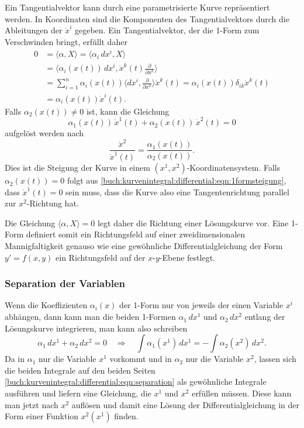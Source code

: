 Ein Tangentialvektor kann durch eine parametrisierte Kurve repräsentiert
werden.
In Koordinaten sind die Komponenten des Tangentialvektors durch
die Ableitungen der $\dot{x}^i$ gegeben.
Ein Tangentialvektor, der die 1-Form zum Verschwinden bringt, erfüllt
daher
\begin{align*}
0
&=
\langle\alpha, X\rangle
=
\langle
\alpha_i\,dx^i,
X
\rangle
\\
&=
\biggl\langle
\alpha_i(x(t))\,dx^i,
\dot{x}^k(t)\frac{\partial}{\partial x^k}
\biggr\rangle
\\
&=
\sum_{i=1}^n
\alpha_i(x(t))
\biggl\langle
dx^i,\frac{\partial}{\partial x^k}
\biggr\rangle
\dot{x}^k(t)
=
\alpha_i(x(t))\delta_{ik}\dot{x}^k(t)
\\
&=
\alpha_i(x(t))\dot{x}^i(t).
\end{align*}
Falls $\alpha_2(x(t))\ne 0$ ist, kann die Gleichung
\begin{equation}
\alpha_1(x(t))\, \dot{x}^1(t) + \alpha_2(x(t))\,\dot{x}^2(t) = 0
\label{buch:kurvenintegral:differential:eqn:1formsteigung}
\end{equation}
aufgelöst werden nach
\[
\frac{\dot{x}^2}{\dot{x}^1(t)}
=
\frac{\alpha_1(x(t))}{\alpha_2(x(t))}.
\]
Dies ist die Steigung der Kurve in einem 
$(x^1,x^2)$-Koordinatensystem.
Falls $\alpha_2(x(t))=0$ folgt aus
\eqref{buch:kurvenintegral:differential:eqn:1formsteigung}, dass
$\dot{x}^1(t)=0$ sein muss, dass die Kurve also eine Tangentenrichtung
parallel zur $x^2$-Richtung hat.

Die Gleichung $\langle\alpha,X\rangle=0$ legt daher die Richtung
einer Lösungskurve vor.
Eine 1-Form definiert somit ein Richtungsfeld auf einer zweidimensionalen
Mannigfaltigkeit genauso wie eine gewöhnliche Differentialgleichung
der Form $y'=f(x,y)$ ein Richtungsfeld auf der $x$-$y$-Ebene festlegt.

%
%
\subsubsection{Separation der Variablen}
Wenn die Koeffizienten $\alpha_i(x)$ der 1-Form nur von jeweils der einen
Variable $x^i$ abhängen, dann kann man die beiden 1-Formen
$\alpha_1\,dx^1$ und $\alpha_2\,dx^2$ entlang der Lösungskurve
integrieren, man kann also schreiben
\begin{equation}
\alpha_1\,dx^1
+
\alpha_2\,dx^2
=0
\quad\Rightarrow\quad
\int \alpha_1(x^1)\,dx^1 = -\int \alpha_2(x^2)\,dx^2.
\label{buch:kurvenintegral:differential:eqn:separation}
\end{equation}
Da in $\alpha_1$ nur die Variable $x^1$ vorkommt und in $\alpha_2$
nur die Variable $x^2$, lassen sich die beiden Integrale auf den
beiden Seiten \eqref{buch:kurvenintegral:differential:eqn:separation}
als gewöhnliche Integrale ausführen und liefern eine Gleichung,
die $x^1$ und $x^2$ erfüllen müssen.
Diese kann man jetzt nach $x^2$ auflösen und damit eine Lösung der
Differentialgleichung in der Form einer Funktion $x^2(x^1)$ finden.

